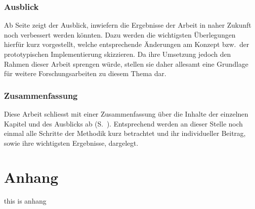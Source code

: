\documentclass[fontsize=11pt,paper=a4,twoside,openright]{scrreprt}
\newcounter{alteSeitenzahl}
\begin{document}
\subsection{Ausblick}
\label{sssec:Ausblick}

Ab Seite \pageref{sec:Fazit Ausblick} zeigt der Ausblick, inwiefern die Ergebnisse der Arbeit in naher Zukunft noch verbessert werden könnten.
Dazu werden die wichtigsten Überlegungen hierfür kurz vorgestellt, welche entsprechende Änderungen am Konzept bzw.\ der prototypischen Implementierung skizzieren.
Da ihre Umsetzung jedoch den Rahmen dieser Arbeit sprengen würde, stellen sie daher allesamt eine Grundlage für weitere Forschungsarbeiten zu diesem Thema dar.

\subsection{Zusammenfassung}
\label{sssec:Zusammenfassung}

Diese Arbeit schliesst mit einer Zusammenfassung über die Inhalte der einzelnen Kapitel und des Ausblicks ab (S.\ \pageref{sec:Zusammenfassung}).
Entsprechend werden an dieser Stelle noch einmal alle Schritte der Methodik kurz betrachtet und ihr individueller Beitrag, sowie ihre wichtigsten Ergebnisse, dargelegt.

\clearpage
{}
\addtocounter{alteSeitenzahl}{-1}
\setcounter{page}{\thealteSeitenzahl}

\listoffigures

\listoftables


{
\let\footnotemark\relax
\lstlistoflistings
}

\printglossary[title=Abkürzungsverzeichnis,toctitle=Abkürzungsverzeichnis,]
\clearpage
{}
\raggedright

\nocite{*}
\clearpage
\appendix
\chapter{Anhang}
this is anhang
\end{document}
